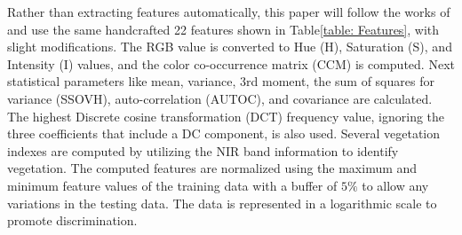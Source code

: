 Rather than extracting features automatically, this paper will follow the works of\cite{Basu2015, Liu2020} and use the same handcrafted 22 features shown in Table\ref{table: Features}, with slight modifications. The RGB value is converted to Hue (H), Saturation (S), and Intensity (I) values, and the color co-occurrence matrix (CCM) is computed\cite{Boyda2017}. Next statistical parameters like mean, variance, 3rd moment, the sum of squares for variance (SSOVH), auto-correlation (AUTOC), and covariance are calculated. The highest Discrete cosine transformation (DCT) frequency value, ignoring the three coefficients that include a DC component, is also used. Several vegetation indexes are computed by utilizing the NIR band information to identify vegetation. The computed features are normalized using the maximum and minimum feature values of the training data with a  buffer of  $5\%$ to allow any variations in the testing data. The data is represented in a logarithmic scale to promote discrimination.

